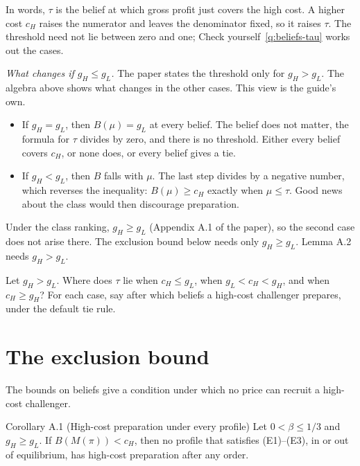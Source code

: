 In words, \(\tau\) is the belief at which gross profit just covers the high cost. A higher cost \(c_H\) raises the numerator and leaves the denominator fixed, so it raises \(\tau\). The threshold need not lie between zero and one; Check yourself~\ref{q:beliefs-tau} works out the cases.

\emph{What changes if \(g_H\le g_L\).} The paper states the threshold only for \(g_H>g_L\). The algebra above shows what changes in the other cases. This view is the guide's own.
\begin{itemize}
\item If \(g_H=g_L\), then \(B(\mu)=g_L\) at every belief. The belief does not matter, the formula for \(\tau\) divides by zero, and there is no threshold. Either every belief covers \(c_H\), or none does, or every belief gives a tie.
\item If \(g_H<g_L\), then \(B\) falls with \(\mu\). The last step divides by a negative number, which reverses the inequality: \(B(\mu)\ge c_H\) exactly when \(\mu\le\tau\). Good news about the class would then discourage preparation.
\end{itemize}
Under the class ranking, \(g_H\ge g_L\) (Appendix A.1 of the paper), so the second case does not arise there. The exclusion bound below needs only \(g_H\ge g_L\). Lemma A.2 needs \(g_H>g_L\).

\begin{checkyourself}\label{q:beliefs-tau}
Let \(g_H>g_L\). Where does \(\tau\) lie when \(c_H\le g_L\), when \(g_L<c_H<g_H\), and when \(c_H\ge g_H\)? For each case, say after which beliefs a high-cost challenger prepares, under the default tie rule.
\end{checkyourself}

\section{The exclusion bound}\label{sec:beliefs-exclusion}

The bounds on beliefs give a condition under which no price can recruit a high-cost challenger.

\begin{paperresult}{Corollary A.1 (High-cost preparation under every profile)}
Let \(0<\beta\le1/3\) and \(g_H\ge g_L\). If \(B(M(\pi))<c_H\), then no profile that satisfies (E1)--(E3), in or out of equilibrium, has high-cost preparation after any order.
\end{paperresult}

